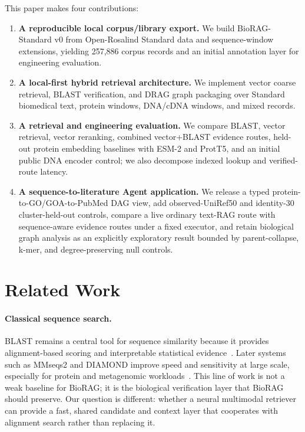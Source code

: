 \documentclass[11pt]{article}
\begin{document}
This paper makes four contributions:
\begin{enumerate}
  \item \textbf{A reproducible local corpus/library export.} We build BioRAG-Standard v0 from Open-Rosalind Standard data and sequence-window extensions, yielding 257,886 corpus records and an initial annotation layer for engineering evaluation.
  \item \textbf{A local-first hybrid retrieval architecture.} We implement vector coarse retrieval, BLAST verification, and DRAG graph packaging over Standard biomedical text, protein windows, DNA/cDNA windows, and mixed records.
  \item \textbf{A retrieval and engineering evaluation.} We compare BLAST, vector retrieval, vector reranking, combined vector+BLAST evidence routes, held-out protein embedding baselines with ESM-2 and ProtT5, and an initial public DNA encoder control; we also decompose indexed lookup and verified-route latency.
  \item \textbf{A sequence-to-literature Agent application.} We release a typed protein-to-GO/GOA-to-PubMed DAG view, add observed-UniRef50 and identity-30 cluster-held-out controls, compare a live ordinary text-RAG route with sequence-aware evidence routes under a fixed executor, and retain biological graph analysis as an explicitly exploratory result bounded by parent-collapse, k-mer, and degree-preserving null controls.
\end{enumerate}

\section{Related Work}

\paragraph{Classical sequence search.}
BLAST remains a central tool for sequence similarity because it provides alignment-based scoring and interpretable statistical evidence~\cite{altschul1990blast}. Later systems such as MMseqs2 and DIAMOND improve speed and sensitivity at large scale, especially for protein and metagenomic workloads~\cite{steinegger2017mmseqs2,buchfink2021diamond}. This line of work is not a weak baseline for BioRAG; it is the biological verification layer that BioRAG should preserve. Our question is different: whether a neural multimodal retriever can provide a fast, shared candidate and context layer that cooperates with alignment search rather than replacing it.
\end{document}
